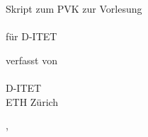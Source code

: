 

\thispagestyle{empty}  %
\large  %

\begin{center}

\vfill


Skript zum PVK zur Vorlesung\\[10mm]

{\LARGE\bfseries\mytitle} \\
\vspace{1cm}
für D-ITET
\vfill


verfasst von \\[5mm]
{\large\bfseries\myauthor}\\[5mm]
D-ITET\\
ETH Zürich

\vfill

\mysubmissiontown, \mysubmissionmonth~\mysubmissionyear

\end{center}
\normalsize %

\newpage


